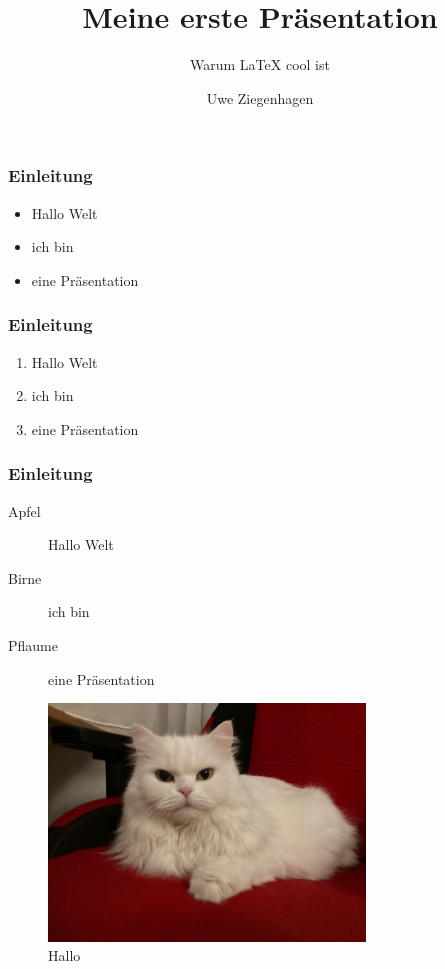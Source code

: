 \documentclass[12pt,ngerman]{beamer}
\title{Meine erste Präsentation}
\author{Uwe Ziegenhagen}
\subtitle{Warum LaTeX cool ist}
\institute{Dante e.V.}
\begin{document}
\begin{frame}

\maketitle


\end{frame}

\begin{frame}
\frametitle{Einleitung}

\begin{itemize}
\item Hallo Welt
\item ich bin 
\item eine Präsentation
\end{itemize}


\end{frame}

\begin{frame}
\frametitle{Einleitung}

\begin{enumerate}
\item Hallo Welt
\item ich bin 
\item eine Präsentation
\end{enumerate}


\end{frame}

\begin{frame}
\frametitle{Einleitung}

\begin{description}
\item [Apfel] Hallo Welt
\item [Birne]  ich bin 
\item [Pflaume] eine Präsentation
\end{description}


\end{frame}

\begin{frame}

\begin{figure}
\begin{center}
\includegraphics[width=0.75\textwidth]{Bilder/Katze}
\caption{Hallo}
\end{center}
\end{figure}


\end{frame}
\end{document}

